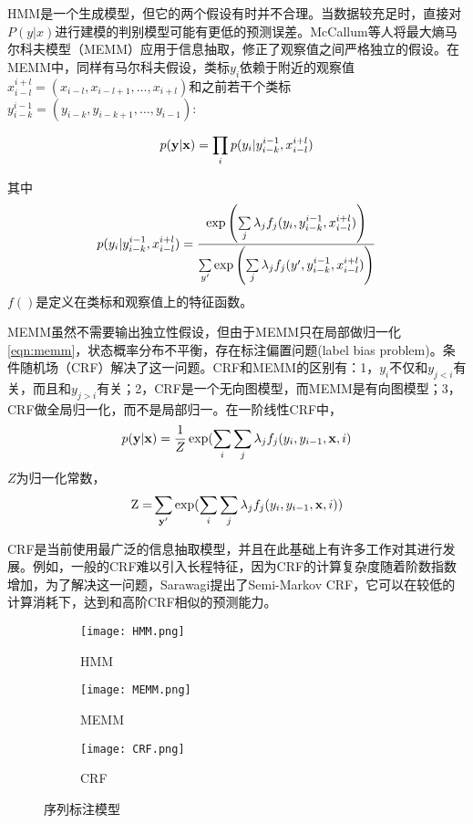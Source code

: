 HMM是一个生成模型，但它的两个假设有时并不合理。当数据较充足时，直接对$P(y|x)$进行建模的判别模型可能有更低的预测误差。McCallum等人将最大熵马尔科夫模型（MEMM）应用于信息抽取\cite{mccallum2000maximum}，修正了观察值之间严格独立的假设。在MEMM中，同样有马尔科夫假设，类标$y_i$依赖于附近的观察值$x_{i - l}^{i + l} = ({x_{i - l}},{x_{i - l + 1}}, \ldots ,{x_{i + l}})$和之前若干个类标$y_{i - k}^{i - 1} = ({y_{i - k}},{y_{i - k + 1}}, \ldots ,{y_{i - 1}})$:

\[p({\bf{y}}|{\bf{x}}) = \prod\limits_i {p({y_i}|y_{i - k}^{i - 1},x_{i - l}^{i + l})} \]

其中
\begin{equation}
{p({y_i}|y_{i - k}^{i - 1},x_{i - l}^{i + l})} = \frac{{\exp \left( {\sum\limits_j {{\lambda _j}{f_j}({y_i}} ,y_{i - k}^{i - 1},x_{i - l}^{i{\rm{ + }}l})} \right)}}{{\sum\limits_{y'} {\exp \left( {\sum\limits_j {{\lambda _j}{f_j}(y'} ,y_{i - k}^{i - 1},x_{i - l}^{i{\rm{ + }}l})} \right)} }} 
\label{eqn:memm}
\end{equation}
$f()$是定义在类标和观察值上的特征函数。

MEMM虽然不需要输出独立性假设，但由于MEMM只在局部做归一化\ref{eqn:memm}，状态概率分布不平衡，存在标注偏置问题(label bias problem)。条件随机场（CRF）\cite{lafferty2001conditional}解决了这一问题。CRF和MEMM的区别有：1，$y_i$不仅和$y_{j<i}$有关，而且和$y_{j>i}$有关；2，CRF是一个无向图模型，而MEMM是有向图模型；3，CRF做全局归一化，而不是局部归一。在一阶线性CRF中，
\[ p({\bf{y}}|{\bf{x}}) = \frac{1}{Z}\exp (\sum\limits_i {\sum\limits_j {{\lambda _j}{f_j}({y_i},{y_{i - 1}},{\bf{x}},i)} } \]
$Z$为归一化常数，	
\[{\rm{Z = }}\sum\limits_{{\bf{y'}}} {\exp (\sum\limits_i {\sum\limits_j {{\lambda _j}{f_j}({y_i},{y_{i - 1}},{\bf{x}},i)} } }) \]

CRF是当前使用最广泛的信息抽取模型，并且在此基础上有许多工作对其进行发展。例如，一般的CRF难以引入长程特征，因为CRF的计算复杂度随着阶数指数增加，为了解决这一问题，Sarawagi\cite{sarawagi2004semi}提出了Semi-Markov CRF，它可以在较低的计算消耗下，达到和高阶CRF相似的预测能力。

\begin{figure}[h]
\centering
\begin{subfigure}{0.3\textwidth}
\texttt{[image: HMM.png]}
\caption{HMM}
\end{subfigure}
\hspace{1em}
\begin{subfigure}{0.3\textwidth}
\texttt{[image: MEMM.png]}
\caption{MEMM}
\end{subfigure}
\hspace{1em}
\begin{subfigure}{0.3\textwidth}
\texttt{[image: CRF.png]}
\caption{CRF}
\end{subfigure}

\caption{序列标注模型}
\label{fig:seq_label_model}
\end{figure}

